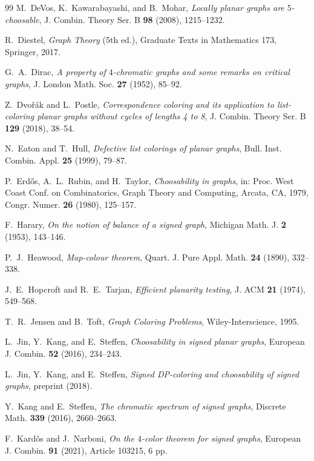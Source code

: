 \documentclass[11pt,a4paper]{article}
\theoremstyle{plain}
\theoremstyle{definition}
\begin{document}
\begin{thebibliography}{99}
M.~DeVos, K.~Kawarabayashi, and B.~Mohar,
\emph{Locally planar graphs are $5$-choosable},
J. Combin. Theory Ser. B \textbf{98} (2008), 1215--1232.

R.~Diestel,
\emph{Graph Theory} (5th ed.),
Graduate Texts in Mathematics 173, Springer, 2017.

G.~A.~Dirac,
\emph{A property of $4$-chromatic graphs and some remarks on critical graphs},
J. London Math. Soc. \textbf{27} (1952), 85--92.

Z.~Dvo\v{r}\'ak and L.~Postle,
\emph{Correspondence coloring and its application to list-coloring planar graphs without cycles of lengths 4 to 8},
J. Combin. Theory Ser. B \textbf{129} (2018), 38--54.

N.~Eaton and T.~Hull,
\emph{Defective list colorings of planar graphs},
Bull. Inst. Combin. Appl. \textbf{25} (1999), 79--87.

P.~Erd\H{o}s, A.~L.~Rubin, and H.~Taylor,
\emph{Choosability in graphs},
in: Proc. West Coast Conf. on Combinatorics, Graph Theory and Computing, Arcata, CA, 1979,
Congr. Numer. \textbf{26} (1980), 125--157.

F.~Harary,
\emph{On the notion of balance of a signed graph},
Michigan Math. J. \textbf{2} (1953), 143--146.

P.~J.~Heawood,
\emph{Map-colour theorem},
Quart. J. Pure Appl. Math. \textbf{24} (1890), 332--338.

J.~E.~Hopcroft and R.~E.~Tarjan,
\emph{Efficient planarity testing},
J. ACM \textbf{21} (1974), 549--568.

T.~R.~Jensen and B.~Toft,
\emph{Graph Coloring Problems},
Wiley-Interscience, 1995.

L.~Jin, Y.~Kang, and E.~Steffen,
\emph{Choosability in signed planar graphs},
European J. Combin. \textbf{52} (2016), 234--243.

L.~Jin, Y.~Kang, and E.~Steffen,
\emph{Signed DP-coloring and choosability of signed graphs},
preprint (2018).

Y.~Kang and E.~Steffen,
\emph{The chromatic spectrum of signed graphs},
Discrete Math. \textbf{339} (2016), 2660--2663.

F.~Kard\v{o}s and J.~Narboni,
\emph{On the $4$-color theorem for signed graphs},
European J. Combin. \textbf{91} (2021), Article 103215, 6 pp.


\end{thebibliography}
\end{document}
